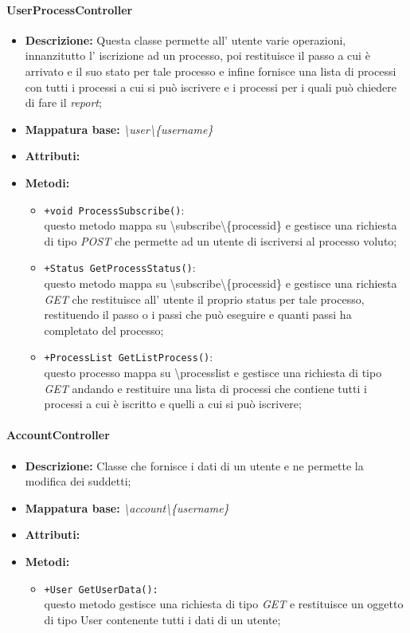 \paragraph{UserProcessController}%
\begin{itemize}
	\item \textbf{Descrizione: } Questa classe permette all' utente varie operazioni, innanzitutto l' iscrizione ad un processo, poi restituisce il passo a cui è arrivato e il suo stato per tale processo e infine fornisce una lista di processi con tutti i processi a cui si può iscrivere e i processi per i quali può chiedere di fare il \textit{report};
	\item \textbf{Mappatura base: } \textit{\textbackslash user\textbackslash \{username\}}
	\item \textbf{Attributi: }
	\item \textbf{Metodi: }\begin{itemize}
					\item \texttt{+void ProcessSubscribe()}:\\
					questo metodo mappa su \textbackslash subscribe\textbackslash \{processid\} e gestisce una richiesta di tipo \textit{POST} che permette ad un utente di iscriversi al processo voluto;
					\item \texttt{+Status GetProcessStatus()}:\\
					questo metodo mappa su \textbackslash subscribe\textbackslash \{processid\} e gestisce una richiesta \textit{GET} che restituisce all' utente il proprio status per tale processo, restituendo il passo o i passi che può eseguire e quanti passi ha completato del processo;
					\item \texttt{+ProcessList GetListProcess()}:\\
					questo processo mappa su \textbackslash processlist e gestisce una richiesta di tipo \textit{GET} andando e restituire una lista di processi che contiene tutti i processi  a cui è iscritto e quelli a cui si può iscrivere;
				\end{itemize}
\end{itemize}
\paragraph{AccountController}%
\begin{itemize}
	\item \textbf{Descrizione: } Classe che fornisce i dati di un utente e ne permette la modifica dei suddetti;
	\item \textbf{Mappatura base: } \textit{\textbackslash account\textbackslash \{username\}}
	\item \textbf{Attributi: } 
	\item \textbf{Metodi: }\begin{itemize}
					\item \texttt{+User GetUserData():}\\
					questo metodo gestisce una richiesta di tipo \textit{GET} e restituisce un oggetto di tipo User contenente tutti i dati di un utente;
				\end{itemize}
\end{itemize}
